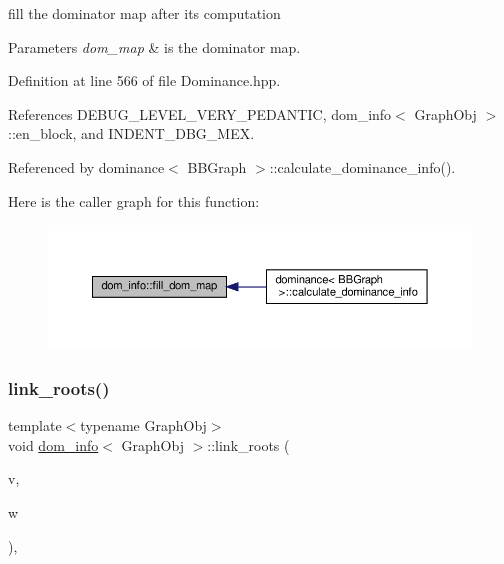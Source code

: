 fill the dominator map after its computation 


\begin{DoxyParams}{Parameters}
{\em dom\+\_\+map} & is the dominator map. \\
\hline
\end{DoxyParams}


Definition at line 566 of file Dominance.\+hpp.



References D\+E\+B\+U\+G\+\_\+\+L\+E\+V\+E\+L\+\_\+\+V\+E\+R\+Y\+\_\+\+P\+E\+D\+A\+N\+T\+IC, dom\+\_\+info$<$ Graph\+Obj $>$\+::en\+\_\+block, and I\+N\+D\+E\+N\+T\+\_\+\+D\+B\+G\+\_\+\+M\+EX.



Referenced by dominance$<$ B\+B\+Graph $>$\+::calculate\+\_\+dominance\+\_\+info().

Here is the caller graph for this function\+:
\nopagebreak
\begin{figure}[H]
\begin{center}
\leavevmode
\includegraphics[width=350pt]{d3/dea/classdom__info_af9e42db7ab94585f85b213682e4e95f7_icgraph}
\end{center}
\end{figure}
\mbox{\label{classdom__info_a6cd51fb7e9240c93d7f254b2a5e5b36a}} 
\subsubsection{\texorpdfstring{link\+\_\+roots()}{link\_roots()}}
{\footnotesize\ttfamily template$<$typename Graph\+Obj$>$ \\
void \hyperlink{classdom__info}{dom\+\_\+info}$<$ Graph\+Obj $>$\+::link\+\_\+roots (\begin{DoxyParamCaption}\item[{\hyperlink{Dominance_8hpp_ac35ffd4ddeccae8225d6ec6f55d65a97}{T\+BB}}]{v,  }\item[{\hyperlink{Dominance_8hpp_ac35ffd4ddeccae8225d6ec6f55d65a97}{T\+BB}}]{w }\end{DoxyParamCaption})\hspace{0.3cm}{\ttfamily [inline]}, {\ttfamily [private]}}



